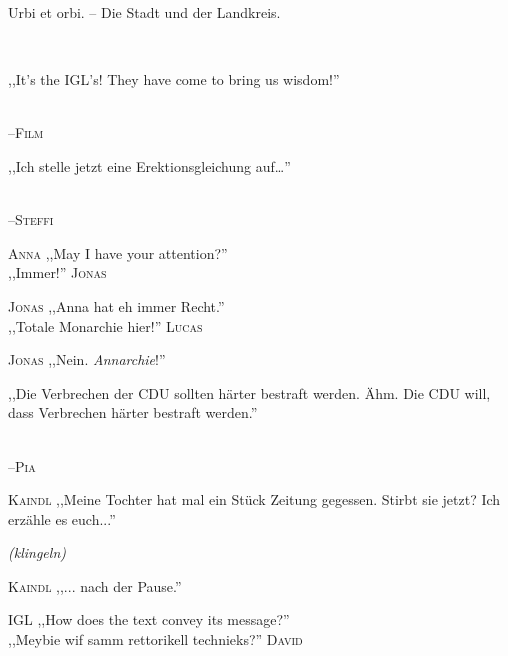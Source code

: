
\vspace{3mm}
{\raggedright Urbi et orbi. – Die Stadt und der Landkreis.}\\

\vspace{3mm}
{\raggedright ,,It’s the IGL’s! They have come to bring us wisdom!''}\\
\raggedleft \textsc{\footnotesize --\/Film}\\

\vspace{3mm}
{\raggedright ,,Ich stelle jetzt eine Erektionsgleichung auf…''}\\
\raggedleft \textsc{\footnotesize --\/Steffi}\\

\vspace{3mm}
\hangindent=0.7cm
\raggedright \textsc{\footnotesize Anna} ,,May I have your attention?''\\
\raggedleft ,,Immer!'' \textsc{\footnotesize Jonas}\\

\vspace{3mm}
\hangindent=0.7cm
\raggedright \textsc{\footnotesize Jonas} ,,Anna hat eh immer Recht.''\\
\raggedleft ,,Totale Monarchie hier!'' \textsc{\footnotesize Lucas}\\
\hangindent=0.7cm
\raggedright \textsc{\footnotesize Jonas} ,,Nein. \emph{Annarchie}!''\\

\vspace{3mm}
{\raggedright ,,Die Verbrechen der CDU sollten härter bestraft werden. Ähm. Die CDU will, dass Verbrechen härter bestraft werden.''}\\
\raggedleft \textsc{\footnotesize --\/Pia}\\

\vspace{3mm}
\hangindent=0.7cm
\raggedright \textsc{\footnotesize Kaindl} ,,Meine Tochter hat mal ein Stück Zeitung gegessen. Stirbt sie jetzt? Ich erzähle es euch...''\\
\raggedright \emph{\footnotesize (klingeln)}\\
\hangindent=0.7cm
\raggedright \textsc{\footnotesize Kaindl} ,,... nach der Pause.''\\

\vspace{3mm}
\hangindent=0.7cm
\raggedright \textsc{\footnotesize IGL} ,,How does the text convey its message?''\\
\raggedleft ,,Meybie wif samm rettorikell technieks?'' \textsc{\footnotesize David}\\

